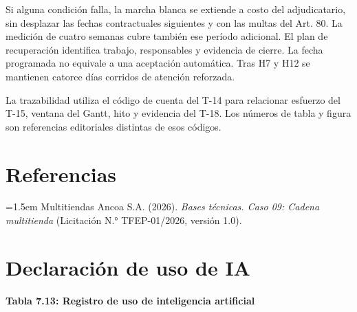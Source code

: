 \documentclass[11pt]{article}
\begin{document}
Si alguna condición falla, la marcha blanca se extiende a costo del adjudicatario, sin desplazar las fechas contractuales siguientes y con las multas del Art. 80. La medición de cuatro semanas cubre también ese período adicional. El plan de recuperación identifica trabajo, responsables y evidencia de cierre. La fecha programada no equivale a una aceptación automática. Tras H7 y H12 se mantienen catorce días corridos de atención reforzada.

La trazabilidad utiliza el código de cuenta del T-14 para relacionar esfuerzo del T-15, ventana del Gantt, hito y evidencia del T-18. Los números de tabla y figura son referencias editoriales distintas de esos códigos.


\section{Referencias}\label{referencias}

\noindent\hangindent=1.5em Multitiendas Ancoa S.A. (2026). \textit{Bases técnicas. Caso 09: Cadena multitienda} (Licitación N.° TFEP-01/2026, versión 1.0).

\section*{Declaración de uso de IA}

\textbf{Tabla 7.13: Registro de uso de inteligencia artificial}
\end{document}

